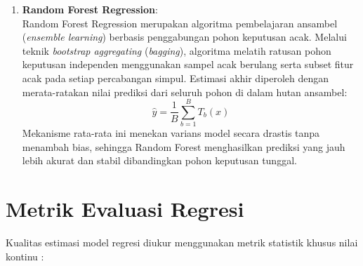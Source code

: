 \documentclass[a4paper,oneside,12pt]{report}
\begin{document}
\begin{enumerate}
    \item \textbf{Random Forest Regression}: \\
    Random Forest Regression merupakan algoritma pembelajaran ansambel (\textit{ensemble learning}) berbasis penggabungan pohon keputusan acak. Melalui teknik \textit{bootstrap aggregating} (\textit{bagging}), algoritma melatih ratusan pohon keputusan independen menggunakan sampel acak berulang serta subset fitur acak pada setiap percabangan simpul. Estimasi akhir diperoleh dengan merata-ratakan nilai prediksi dari seluruh pohon di dalam hutan ansambel:
    \begin{equation}
        \hat{y} = \frac{1}{B}\sum_{b=1}^B T_b(x)
    \end{equation}
    Mekanisme rata-rata ini menekan varians model secara drastis tanpa menambah bias, sehingga Random Forest menghasilkan prediksi yang jauh lebih akurat dan stabil dibandingkan pohon keputusan tunggal.
\end{enumerate}

\section{Metrik Evaluasi Regresi}
Kualitas estimasi model regresi diukur menggunakan metrik statistik khusus nilai kontinu \cite{ref4}:
\end{document}
